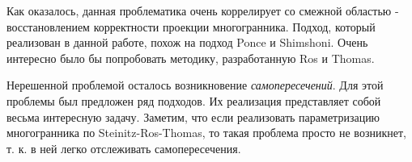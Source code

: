 \documentclass[a4paper,12pt, titlepage]{article}
\begin{document}
\begin{flushleft}
      Как оказалось, данная проблематика очень коррелирует со смежной областью - 
восстановлением корректности проекции многогранника. Подход, который реализован
в данной работе, похож на подход Ponce и Shimshoni. Очень интересно было бы попробовать
методику, разработанную Ros и Thomas.
\end{flushleft}

\begin{flushleft}
    Нерешенной проблемой осталось возникновение \textit{самопересечений}. Для этой проблемы был
предложен ряд подходов. Их реализация представляет собой весьма интересную задачу.
Заметим, что если реализовать параметризацию многогранника по Steinitz-Ros-Thomas,
то такая проблема просто не возникнет, т. к. в ней легко отслеживать самопересечения.
\end{flushleft}
\end{document}
